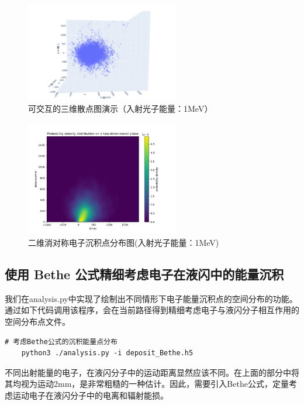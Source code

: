\documentclass[12pt,a4paper]{article}%
\begin{document}
        \begin{figure}[h]
            \centering
            \includegraphics[width=0.6\textwidth]{deposit.png}
            \caption{可交互的三维散点图演示（入射光子能量：1MeV）}
            \label{fig:deposit_gif}
        \end{figure}
        \begin{figure}[h]
            \centering
            \includegraphics[width=0.6\textwidth]{deposit_dissymmetry.png}
            \caption{二维消对称电子沉积点分布图(入射光子能量：1MeV)}
            \label{fig:deposit_dissymmetry}
        \end{figure}
    \subsection{使用 Bethe 公式精细考虑电子在液闪中的能量沉积}
        
    我们在analysis.py中实现了绘制出不同情形下电子能量沉积点的空间分布的功能。通过如下代码调用该程序，会在当前路径得到精细考虑电子与液闪分子相互作用的空间分布点文件。
    \begin{lstlisting}[style=mystyle,label=code:bash]
    # 考虑Bethe公式的沉积能量点分布
    python3 ./analysis.py -i deposit_Bethe.h5
    \end{lstlisting}
    
        不同出射能量的电子，在液闪分子中的运动距离显然应该不同。在上面的部分中将其均视为运动2mm，是非常粗糙的一种估计。因此，需要引入Bethe公式，定量考虑运动电子在液闪分子中的电离和辐射能损。
        
\end{document}

